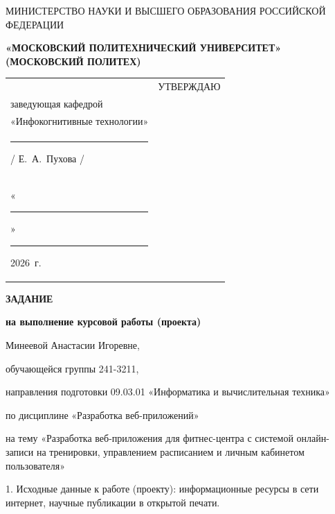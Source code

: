 \documentclass[14pt, a4paper]{extarticle}
\begin{document}
\pagestyle{empty}


\begin{center}
    {\small МИНИСТЕРСТВО НАУКИ И ВЫСШЕГО ОБРАЗОВАНИЯ РОССИЙСКОЙ ФЕДЕРАЦИИ}


    {\small \textbf{«МОСКОВСКИЙ ПОЛИТЕХНИЧЕСКИЙ УНИВЕРСИТЕТ»}} \\
    {\small \textbf{(МОСКОВСКИЙ ПОЛИТЕХ)}}
\end{center}

\begin{tabularx}{\textwidth}{@{} p{} p{} @{}}
     &
    \raggedright
    УТВЕРЖДАЮ                          \\
    заведующая кафедрой                \\
    «Инфокогнитивные технологии»       \\[0.3cm]

    \rule{3cm}{0.4pt} / Е.~А.~Пухова / \\[0.1cm]

    «\rule{0.8cm}{0.4pt}» \rule{3cm}{0.4pt} 2026~г.
\end{tabularx}


\begin{center}

    { \large \textbf{ЗАДАНИЕ}}

    \textbf{на выполнение курсовой работы (проекта)}

    Минеевой Анастасии Игоревне, %

\end{center}

обучающейся группы 241-3211,

направления подготовки 09.03.01 «Информатика и вычислительная техника»

по дисциплине «Разработка веб-приложений»

на тему «Разработка веб-приложения для фитнес-центра с системой онлайн-записи на тренировки,
управлением расписанием и личным кабинетом пользователя»

1. Исходные данные к работе (проекту): информационные ресурсы в сети
интернет, научные публикации в открытой печати.
\end{document}

